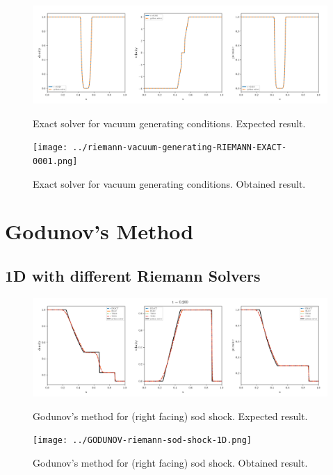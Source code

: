 \begin{figure}[htbp]
    \centering
	\includegraphics[width=.9\textwidth]{./figures/riemann-vacuum-generating-RIEMANN-EXACT-overplotted.png}%
	\caption{Exact solver for vacuum generating conditions. Expected result.}
	\texttt{[image: ../riemann-vacuum-generating-RIEMANN-EXACT-0001.png]}%
	\caption{Exact solver for vacuum generating conditions. Obtained result.}
\end{figure}












\clearpage
\section{Godunov's Method}
\subsection{1D with different Riemann Solvers}

\begin{figure}[htbp]
    \centering
	\includegraphics[width=.9\textwidth]{./figures/GODUNOV-riemann-sod-shock-1D.png}%
	\caption{Godunov's method for (right facing) sod shock. Expected result.}
	\texttt{[image: ../GODUNOV-riemann-sod-shock-1D.png]}%
	\caption{Godunov's method for (right facing) sod shock. Obtained result.}
\end{figure}


